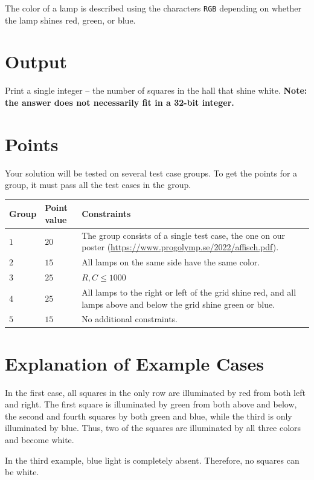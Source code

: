 The color of a lamp is described using the characters \texttt{RGB} depending on whether the lamp shines red, green, or blue.

\section*{Output}
Print a single integer -- the number of squares in the hall that shine white.
\textbf{Note: the answer does not necessarily fit in a 32-bit integer.}

\section*{Points}
Your solution will be tested on several test case groups.
To get the points for a group, it must pass all the test cases in the group.

\noindent
\begin{tabular}{| l | l | p{12cm} |}
  \hline
  \textbf{Group} & \textbf{Point value} & \textbf{Constraints} \\ \hline
  $1$    & $20$        &  The group consists of a single test case, the one on our poster (\url{https://www.progolymp.se/2022/affisch.pdf}). \\ \hline 
  $2$    & $15$        &  All lamps on the same side have the same color. \\ \hline
  $3$    & $25$        &  $R,C \le 1000$ \\ \hline 
  $4$    & $25$        &  All lamps to the right or left of the grid shine red, and all lamps above and below the grid shine green or blue. \\ \hline
  $5$    & $15$        &  No additional constraints. \\ \hline
\end{tabular}

\section*{Explanation of Example Cases}
In the first case, all squares in the only row are illuminated by red from both left and right.
The first square is illuminated by green from both above and below, the second and fourth squares by both green and blue, while the third is only illuminated by blue.
Thus, two of the squares are illuminated by all three colors and become white.

In the third example, blue light is completely absent.
Therefore, no squares can be white.
